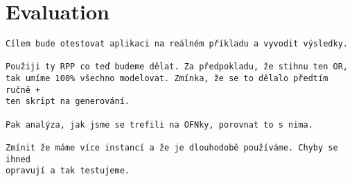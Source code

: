 \chapter{Evaluation}
\label{chapters:evaluation}

\begin{Verbatim}
Cílem bude otestovat aplikaci na reálném příkladu a vyvodit výsledky.

Použiji ty RPP co teď budeme dělat. Za předpokladu, že stihnu ten OR,
tak umíme 100% všechno modelovat. Zmínka, že se to dělalo předtím ručně +
ten skript na generování.

Pak analýza, jak jsme se trefili na OFNky, porovnat to s nima.

Zmínit že máme více instancí a že je dlouhodobě používáme. Chyby se ihned
opravují a tak testujeme.
\end{Verbatim}

